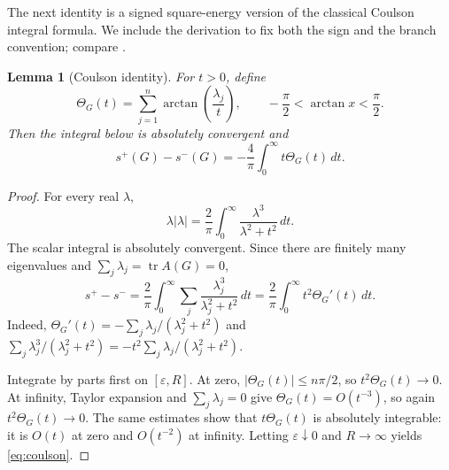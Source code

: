 \documentclass[11pt]{article}
\newtheorem{lemma}[theorem]{Lemma}
\theoremstyle{definition}
\theoremstyle{remark}
\begin{document}
The next identity is a signed square-energy version of the classical
Coulson integral formula.  We include the derivation to fix both the sign
and the branch convention; compare \cite{Coulson,NingZeng}.

\begin{lemma}[Coulson identity]\label{lem:coulson}
For $t>0$, define
\begin{equation}\label{eq:Theta}
 \Theta_G(t)=\sum_{j=1}^n\arctan\!\left(\frac{\lambda_j}{t}\right),
 \qquad -\frac\pi2<\arctan x<\frac\pi2.
\end{equation}
Then the integral below is absolutely convergent and
\begin{equation}\label{eq:coulson}
 s^+(G)-s^-(G)=-\frac4\pi\int_0^\infty t\Theta_G(t)\,dt.
\end{equation}
\end{lemma}

\begin{proof}
For every real $\lambda$,
\[
 \lambda|\lambda|=\frac2\pi\int_0^\infty
       \frac{\lambda^3}{\lambda^2+t^2}\,dt.
\]
The scalar integral is absolutely convergent.  Since there are finitely
many eigenvalues and $\sum_j\lambda_j=\operatorname{tr}A(G)=0$,
\[
 s^+-s^-=\frac2\pi\int_0^\infty
 \sum_j\frac{\lambda_j^3}{\lambda_j^2+t^2}\,dt
 =\frac2\pi\int_0^\infty t^2\Theta_G'(t)\,dt.
\]
Indeed,
$\Theta_G'(t)=-\sum_j\lambda_j/(\lambda_j^2+t^2)$ and
$\sum_j\lambda_j^3/(\lambda_j^2+t^2)
=-t^2\sum_j\lambda_j/(\lambda_j^2+t^2)$.

Integrate by parts first on $[\varepsilon,R]$.  At zero,
$|\Theta_G(t)|\le n\pi/2$, so $t^2\Theta_G(t)\to0$.  At infinity,
Taylor expansion and $\sum_j\lambda_j=0$ give
$\Theta_G(t)=O(t^{-3})$, so again $t^2\Theta_G(t)\to0$.
The same estimates show that $t\Theta_G(t)$ is absolutely integrable:
it is $O(t)$ at zero and $O(t^{-2})$ at infinity.  Letting
$\varepsilon\downarrow0$ and $R\to\infty$ yields
\eqref{eq:coulson}.
\end{proof}
\end{document}

